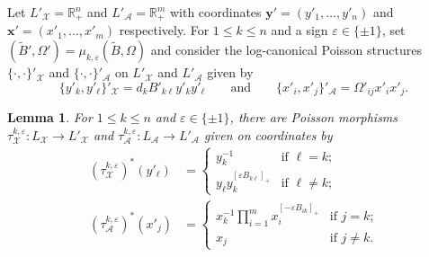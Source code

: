 \documentclass{amsart}
\newtheorem{lemma}[theorem]{Lemma}
\numberwithin{equation}{section}
\newcommand{\bfx}{\mathbf{x}}
\newcommand{\bfy}{\mathbf{y}}
\newcommand{\cA}{\mathcal{A}}
\newcommand{\cX}{\mathcal{X}}
\newcommand{\RR}{\mathbb{R}}
\begin{document}
Let $L'_\cX=\RR_+^n$ and $L'_\cA=\RR_+^m$ with coordinates $\bfy'=(y'_1,\ldots,y'_n)$ and $\bfx'=(x'_1,\ldots,x'_m)$ respectively.
For $1\le k\le n$ and a sign $\varepsilon\in\{\pm1\}$, set $(\tilde B',\Omega')=\mu_{k,\varepsilon}(\tilde B,\Omega)$ and consider the log-canonical Poisson structures $\{\cdot,\cdot\}'_\cX$ and $\{\cdot,\cdot\}'_\cA$ on $L'_\cX$ and $L'_\cA$ given by
\begin{equation}
  \label{eq:brackets}
  \{y'_k,y'_\ell\}'_\cX=d_kB'_{k\ell}y'_ky'_\ell\qquad\text{and}\qquad\{x'_i,x'_j\}'_\cA=\Omega'_{ij}x'_ix'_j.
\end{equation}
\begin{lemma}
  \label{le:tropical cluster transformations}
  For $1\le k\le n$ and $\varepsilon\in\{\pm1\}$, there are Poisson morphisms $\tau_\cX^{k,\varepsilon}:L_\cX\to L'_\cX$ and $\tau_\cA^{k,\varepsilon}:L_\cA\to L'_\cA$ given on coordinates by
  \begin{align}
    \label{eq:tropical X transformation}
    (\tau_\cX^{k,\varepsilon})^*(y'_\ell)
    &=\begin{cases} 
      y_k^{-1} & \text{if $\ell=k$;}\\ 
      y_\ell y_k^{[\varepsilon B_{k\ell}]_+} & \text{if $\ell\ne k$;}
    \end{cases}\\
    \label{eq:tropical A transformation}
    (\tau_\cA^{k,\varepsilon})^*(x'_j)
    &=\begin{cases} 
      x_k^{-1}\prod\limits_{i=1}^m x_i^{[-\varepsilon B_{ik}]_+} & \text{if $j=k$;}\\
      x_j & \text{if $j\ne k$.}
    \end{cases}
  \end{align}
\end{lemma}
\end{document}
